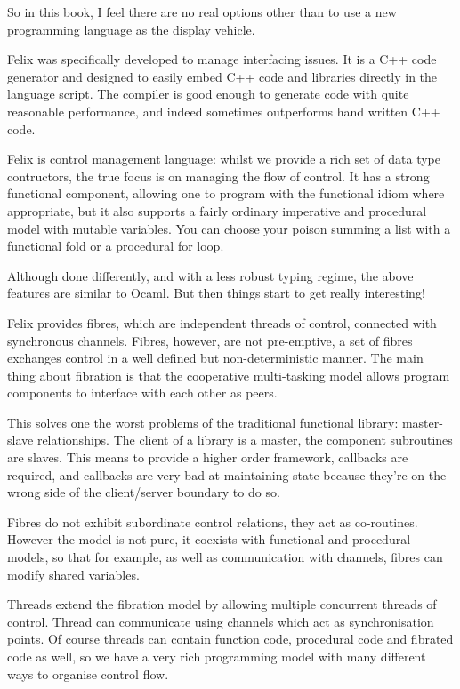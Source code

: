 \documentclass[oneside]{book}
\begin{document}
So in this book, I feel there are no real options other than to
use a new programming language as the display vehicle.

Felix was specifically developed to manage interfacing issues.
It is a C++ code generator and designed to easily embed
C++ code and libraries directly in the language script.
The compiler is good enough to generate code with quite
reasonable performance, and indeed sometimes outperforms
hand written C++ code. 

Felix is control management language: whilst we provide
a rich set of data type contructors, the true focus
is on managing the flow of control. It has a strong functional
component, allowing one to program with the functional
idiom where appropriate, but it also supports a fairly
ordinary imperative and procedural model with mutable
variables. You can choose your poison summing a list
with a functional fold or a procedural for loop.

Although done differently, and with a less robust typing
regime, the above features are similar to Ocaml. But then
things start to get really interesting!

Felix provides fibres, which are independent threads
of control, connected with synchronous channels.
Fibres, however, are not pre-emptive, a set of fibres
exchanges control in a well defined but non-deterministic 
manner. The main thing about fibration is that the cooperative
multi-tasking model allows program components to interface
with each other as peers.

This solves one the worst problems of the traditional
functional library: master-slave relationships.
The client of a library is a master, the component
subroutines are slaves. This means to provide a higher
order framework, callbacks are required, and callbacks
are very bad at maintaining state because they're on
the wrong side of the client/server boundary to do so.

Fibres do not exhibit subordinate control relations,
they act as co-routines. However the model is not pure,
it coexists with functional and procedural models,
so that for example, as well as communication with
channels, fibres can modify shared variables.

Threads extend the fibration model by allowing multiple
concurrent threads of control. Thread can communicate
using channels which act as synchronisation points.
Of course threads can contain function code, procedural
code and fibrated code as well, so we have a very 
rich programming model with many different ways to organise
control flow.
\end{document}
